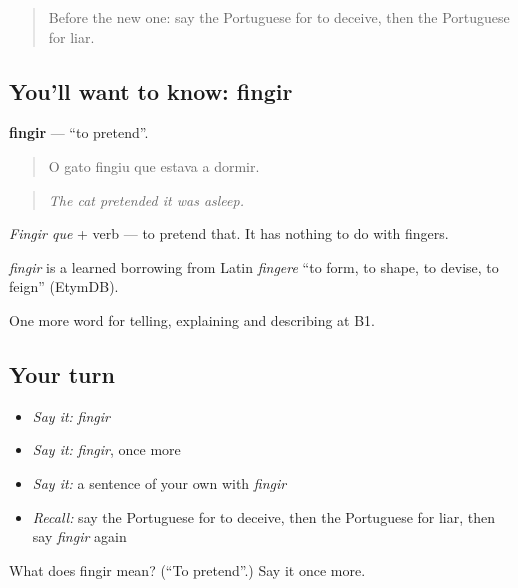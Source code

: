 \label{lesson:PT-C471-fingir}



\begin{quote}
Before the new one: say the Portuguese for to deceive, then the Portuguese for liar.
\end{quote}

\subsection*{You'll want to know: fingir}
\textbf{fingir} — \textquotedblleft{}to pretend\textquotedblright{}.

\begin{quote}
O gato fingiu que estava a dormir.
\end{quote}

\begin{quote}
\emph{The cat pretended it was asleep.}
\end{quote}

\emph{Fingir que} + verb — to pretend that. It has nothing to do with fingers.

\begin{cousinweb}
\emph{fingir} is a learned borrowing from Latin \emph{fingere} \textquotedblleft{}to form, to shape, to devise, to feign\textquotedblright{} (EtymDB).
\end{cousinweb}

\begin{grammarlens}[title={What you've built}]
One more word for telling, explaining and describing at B1.
\end{grammarlens}

\subsection*{Your turn}
\begin{itemize}
\raggedright
  \item \emph{Say it:} \emph{fingir}
  \item \emph{Say it:} \emph{fingir}, once more
  \item \emph{Say it:} a sentence of your own with \emph{fingir}
  \item \emph{Recall:} say the Portuguese for to deceive, then the Portuguese for liar, then say \emph{fingir} again
\end{itemize}

\begin{tcolorbox}[breakable,colback=teal!4,colframe=teal!35!black,title={Before you move on}]
What does fingir mean? (\textquotedblleft{}To pretend\textquotedblright{}.) Say it once more.
\end{tcolorbox}
